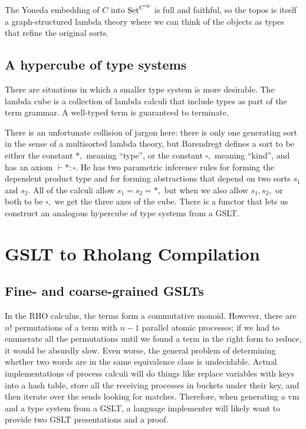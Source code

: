 \documentclass{article}
\begin{document}
The Yoneda embedding of $C$ into ${\rm Set}^{C^{\rm op}}$ is full and faithful, so the topos is itself a graph-structured lambda theory where we can think of the objects as types that refine the original sorts.

\subsection{A hypercube of type systems}

There are situations in which a smaller type system is more desirable. The lambda cube
is a collection of lambda calculi that include types as part of the term grammar.  A well-typed term is guaranteed to terminate.  

There is an unfortunate collision of jargon here: there is only one generating sort in the sense of a multisorted lambda theory, but Barendregt defines a sort to be either the constant $*,$ meaning ``type'', or the constant $\square,$ meaning ``kind'', and has an axiom $\vdash *\colon \square.$  He has two parametric inference rules for forming the dependent product type and for forming abstractions that depend on two sorts $s_1$ and $s_2.$  All of the calculi allow $s_1 = s_2 = *,$ but when we also allow $s_1, s_2,$ or both to be $\square,$ we get the three axes of the cube.  There is a functor that lets us construct an analogous hypercube of type systems from a GSLT.

\section{GSLT to Rholang Compilation}

\subsection{Fine- and coarse-grained GSLTs}
In the RHO calculus, the terms form a commutative monoid.  However, there are $n!$ permutations of a term with $n-1$ parallel atomic processes; if we had to enumerate all the permutations until we found a term in the right form to reduce, it would be absurdly slow.  Even worse, the general problem of determining whether two words are in the same equivalence class is undecidable.  Actual implementations of process calculi will do things like replace variables with keys into a hash table, store all the receiving processes in buckets under their key, and then iterate over the sends looking for matches.  Therefore, when generating a vm and a type system from a GSLT, a language implementer will likely want to provide two GSLT presentations and a proof.
\end{document}
